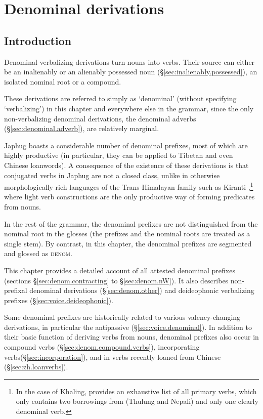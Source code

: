 \chapter{Denominal derivations} \label{chap:denominal}


\section{Introduction}
Denominal verbalizing derivations  turn nouns into verbs. Their source can either be an inalienably or an alienably possessed noun (§\ref{sec:inalienably.possessed}), an isolated nominal root or a compound.

These derivations are referred to simply as `denominal' (without specifying `verbalizing') in this chapter and everywhere else in the grammar, since the only non-verbalizing denominal derivations, the denominal adverbs  (§\ref{sec:denominal.adverb}), are relatively marginal.

Japhug boasts a considerable number of denominal prefixes, most of which are highly productive (in particular, they can be applied to Tibetan and even Chinese loanwords). A consequence of the existence of these derivations is that conjugated verbs in Japhug are not a closed class, unlike in otherwise morphologically rich languages of the Trans-Hima\-la\-yan family such as Kiranti \citep{jacques17pkiranti},\footnote{In the case of Khaling, \citet{jacques15khaling} provides an exhaustive list of all primary verbs, which only contains two borrowings from (Thulung and Nepali) and only one clearly denominal verb.} where light verb constructions are the only productive way of forming predicates from nouns.

In the rest of the grammar, the denominal prefixes are not distinguished from the nominal root in the glosses  (the prefixes and the nominal roots are treated as a single stem). By contrast, in this chapter, the denominal prefixes are segmented and glossed as \textsc{denom}.

This chapter provides a detailed account of all attested denominal prefixes (sections §\ref{sec:denom.contracting} to §\ref{sec:denom.nW}). It also describes non-prefixal denominal derivations (§\ref{sec:denom.other}) and  deideophonic verbalizing prefixes (§\ref{sec:voice.deideophonic}).

 Some denominal  prefixes are historically related to  various valency-changing derivations, in particular the antipassive (§\ref{sec:voice.denominal}).  In addition to their basic function of deriving verbs from nouns, denominal prefixes also occur in compound verbs (§\ref{sec:denom.compound.verbs}), incorporating  verbs(§\ref{sec:incorporation}), and in verbs recently loaned from Chinese (§\ref{sec:zh.loanverbs}).

